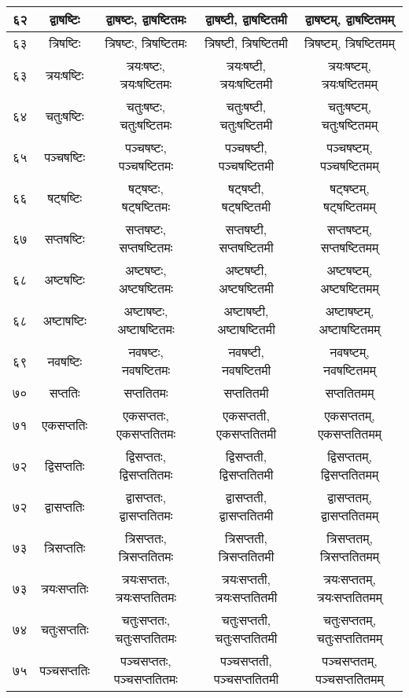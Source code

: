 \documentclass[leqno,fleqn,12pt]{article}%
\begin{document}
\begin{center}
\begin{supertabular}{|lc|c|c|c|}
६२ & द्वाषष्टिः & द्वाषष्टः, द्वाषष्टितमः & द्वाषष्टी, द्वाषष्टितमी & द्वाषष्टम्, द्वाषष्टितमम् \\ \hline 
६३ & त्रिषष्टिः & त्रिषष्टः, त्रिषष्टितमः & त्रिषष्टी, त्रिषष्टितमी & त्रिषष्टम्, त्रिषष्टितमम् \\ \hline 
६३ & त्रयःषष्टिः & त्रयःषष्टः, त्रयःषष्टितमः & त्रयःषष्टी, त्रयःषष्टितमी & त्रयःषष्टम्, त्रयःषष्टितमम् \\ \hline 
६४ & चतुःषष्टिः & चतुःषष्टः, चतुःषष्टितमः & चतुःषष्टी, चतुःषष्टितमी & चतुःषष्टम्, चतुःषष्टितमम् \\ \hline 
६५ & पञ्चषष्टिः & पञ्चषष्टः, पञ्चषष्टितमः & पञ्चषष्टी, पञ्चषष्टितमी & पञ्चषष्टम्, पञ्चषष्टितमम् \\ \hline 
६६ & षट्षष्टिः & षट्षष्टः, षट्षष्टितमः & षट्षष्टी, षट्षष्टितमी & षट्षष्टम्, षट्षष्टितमम् \\ \hline 
६७ & सप्तषष्टिः & सप्तषष्टः, सप्तषष्टितमः & सप्तषष्टी, सप्तषष्टितमी & सप्तषष्टम्, सप्तषष्टितमम् \\ \hline 
६८ & अष्टषष्टिः & अष्टषष्टः, अष्टषष्टितमः & अष्टषष्टी, अष्टषष्टितमी & अष्टषष्टम्, अष्टषष्टितमम् \\ \hline 
६८ & अष्टाषष्टिः & अष्टाषष्टः, अष्टाषष्टितमः & अष्टाषष्टी, अष्टाषष्टितमी & अष्टाषष्टम्, अष्टाषष्टितमम् \\ \hline 
६९ & नवषष्टिः & नवषष्टः, नवषष्टितमः & नवषष्टी, नवषष्टितमी & नवषष्टम्, नवषष्टितमम् \\ \hline 
७० & सप्ततिः & सप्ततितमः & सप्ततितमी & सप्ततितमम् \\ \hline 
७१ & एकसप्ततिः & एकसप्ततः, एकसप्ततितमः & एकसप्तती, एकसप्ततितमी & एकसप्ततम्, एकसप्ततितमम् \\ \hline 
७२ & द्विसप्ततिः & द्विसप्ततः, द्विसप्ततितमः & द्विसप्तती, द्विसप्ततितमी & द्विसप्ततम्, द्विसप्ततितमम् \\ \hline 
७२ & द्वासप्ततिः & द्वासप्ततः, द्वासप्ततितमः & द्वासप्तती, द्वासप्ततितमी & द्वासप्ततम्, द्वासप्ततितमम् \\ \hline 
७३ & त्रिसप्ततिः & त्रिसप्ततः, त्रिसप्ततितमः & त्रिसप्तती, त्रिसप्ततितमी & त्रिसप्ततम्, त्रिसप्ततितमम् \\ \hline 
७३ & त्रयःसप्ततिः & त्रयःसप्ततः, त्रयःसप्ततितमः & त्रयःसप्तती, त्रयःसप्ततितमी & त्रयःसप्ततम्, त्रयःसप्ततितमम् \\ \hline 
७४ & चतुःसप्ततिः & चतुःसप्ततः, चतुःसप्ततितमः & चतुःसप्तती, चतुःसप्ततितमी & चतुःसप्ततम्, चतुःसप्ततितमम् \\ \hline 
७५ & पञ्चसप्ततिः & पञ्चसप्ततः, पञ्चसप्ततितमः & पञ्चसप्तती, पञ्चसप्ततितमी & पञ्चसप्ततम्, पञ्चसप्ततितमम् \\ \hline 

\end{supertabular}
\end{center}
\end{document}
